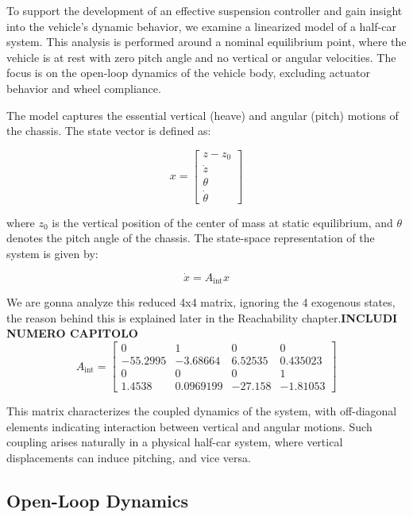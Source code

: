 \documentclass[]{report}
\begin{document}
	To support the development of an effective suspension controller and gain insight into the vehicle's dynamic behavior, we examine a linearized model of a half-car system. This analysis is performed around a nominal equilibrium point, where the vehicle is at rest with zero pitch angle and no vertical or angular velocities. The focus is on the open-loop dynamics of the vehicle body, excluding actuator behavior and wheel compliance.
	
	The model captures the essential vertical (heave) and angular (pitch) motions of the chassis. The state vector is defined as:
	
	\begin{equation}	
		x = \begin{bmatrix}
			z - z_0 \\
			\dot{z} \\
			\theta \\
			\dot{\theta}
		\end{bmatrix}
	\end{equation}
	
	
	where \( z_0 \) is the vertical position of the center of mass at static equilibrium, and \( \theta \) denotes the pitch angle of the chassis. The state-space representation of the system is given by:
	
	\begin{equation}
		\dot{x} = A_{\text{int}} x
	\end{equation}
	
	
	We are gonna analyze this reduced 4x4 matrix, ignoring the 4 exogenous states, the reason behind this is explained later in the Reachability chapter.\textbf{INCLUDI NUMERO CAPITOLO}  
	\[
	A_{\text{int}} =
	\begin{bmatrix}
		0 & 1 & 0 & 0 \\
		-55.2995 & -3.68664 & 6.52535 & 0.435023 \\
		0 & 0 & 0 & 1 \\
		1.4538 & 0.0969199 & -27.158 & -1.81053 
	\end{bmatrix}
	\]
	
	This matrix characterizes the coupled dynamics of the system, with off-diagonal elements indicating interaction between vertical and angular motions. Such coupling arises naturally in a physical half-car system, where vertical displacements can induce pitching, and vice versa.
	
	\subsection{Open-Loop Dynamics}
	
\end{document}

